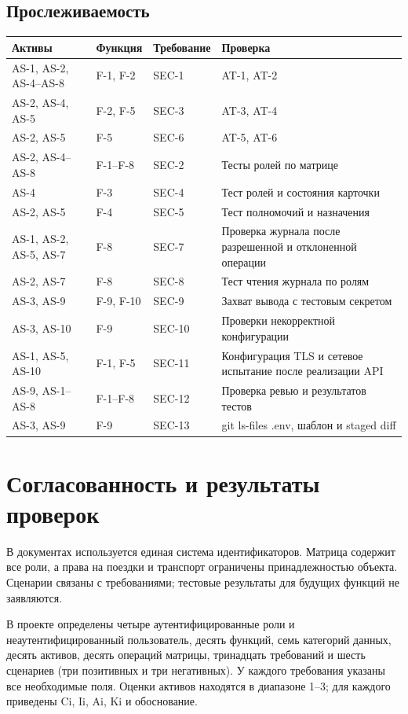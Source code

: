 \documentclass[12pt,a4paper]{article}
\begin{document}
\subsection{Прослеживаемость}
\begin{longtable}{p{2.5cm}p{2.3cm}p{2.5cm}p{7cm}}
\toprule Активы & Функция & Требование & Проверка \\
\midrule\endhead
AS-1, AS-2, AS-4--AS-8 & F-1, F-2 & SEC-1 & AT-1, AT-2 \\
AS-2, AS-4, AS-5 & F-2, F-5 & SEC-3 & AT-3, AT-4 \\
AS-2, AS-5 & F-5 & SEC-6 & AT-5, AT-6 \\
AS-2, AS-4--AS-8 & F-1--F-8 & SEC-2 & Тесты ролей по матрице \\
AS-4 & F-3 & SEC-4 & Тест ролей и состояния карточки \\
AS-2, AS-5 & F-4 & SEC-5 & Тест полномочий и назначения \\
AS-1, AS-2, AS-5, AS-7 & F-8 & SEC-7 & Проверка журнала после разрешенной и отклоненной операции \\
AS-2, AS-7 & F-8 & SEC-8 & Тест чтения журнала по ролям \\
AS-3, AS-9 & F-9, F-10 & SEC-9 & Захват вывода с тестовым секретом \\
AS-3, AS-10 & F-9 & SEC-10 & Проверки некорректной конфигурации \\
AS-1, AS-5, AS-10 & F-1, F-5 & SEC-11 & Конфигурация TLS и сетевое испытание после реализации API \\
AS-9, AS-1--AS-8 & F-1--F-8 & SEC-12 & Проверка ревью и результатов тестов \\
AS-3, AS-9 & F-9 & SEC-13 & git ls-files .env, шаблон и staged diff \\
\bottomrule
\end{longtable}

\section{Согласованность и результаты проверок}
В документах используется единая система идентификаторов. Матрица содержит все роли, а права на поездки и транспорт ограничены принадлежностью объекта. Сценарии связаны с требованиями; тестовые результаты для будущих функций не заявляются.

В проекте определены четыре аутентифицированные роли и неаутентифицированный пользователь, десять функций, семь категорий данных, десять активов, десять операций матрицы, тринадцать требований и шесть сценариев (три позитивных и три негативных). У каждого требования указаны все необходимые поля. Оценки активов находятся в диапазоне 1--3; для каждого приведены Ci, Ii, Ai, Ki и обоснование.
\end{document}
